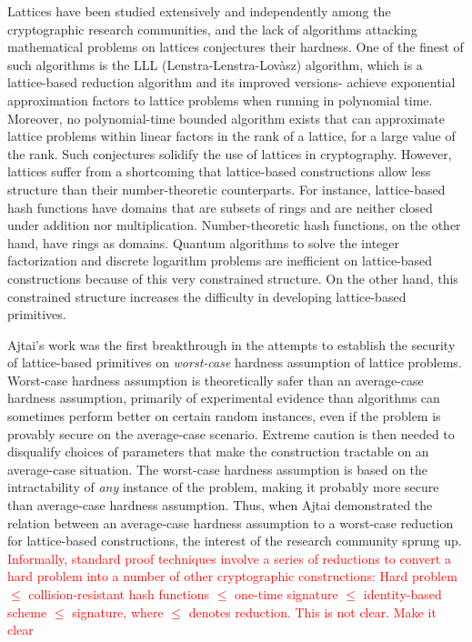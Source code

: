\documentclass[10pt]{elsarticle}
\begin{document}
Lattices have been studied extensively and independently among the
cryptographic research communities, and the lack of algorithms
attacking mathematical problems on lattices conjectures their
hardness. One of the finest of such algorithms is the LLL
(Lenstra-Lenstra-Lov{\`a}sz) \cite{LLL} algorithm, which is a
lattice-based reduction algorithm and its improved versions- achieve
exponential approximation factors to lattice problems when running
in polynomial time. Moreover, no polynomial-time bounded algorithm
exists that can approximate lattice problems within linear factors
in the rank of a lattice, for a large value of the rank. Such
conjectures solidify the use of lattices in cryptography. However,
lattices suffer from a shortcoming that lattice-based constructions
allow less structure than their number-theoretic counterparts. For
instance, lattice-based hash functions have domains that are subsets
of rings and are neither closed under addition nor multiplication.
Number-theoretic hash functions, on the other hand, have rings as
domains. Quantum algorithms to solve the integer factorization and
discrete logarithm problems \cite{CRHF_Shor1997} are inefficient on
lattice-based constructions because of this very constrained
structure. On the other hand, this constrained structure increases
the difficulty in developing lattice-based primitives.

Ajtai's work \cite{CRHF_Ajtai1996} was the first breakthrough in the
attempts to establish the security of lattice-based primitives on
\textit{worst-case} hardness assumption of lattice problems.
Worst-case hardness assumption is theoretically safer than an
average-case hardness assumption, primarily of experimental evidence
than algorithms can sometimes perform better on certain random
instances, even if the problem is provably secure on the
average-case scenario. Extreme caution is then needed to disqualify
choices of parameters that make the construction tractable on an
average-case situation. The worst-case hardness assumption is based
on the intractability of \textit{any} instance of the problem,
making it probably more secure than average-case hardness
assumption. Thus, when Ajtai demonstrated the relation between an
average-case hardness assumption to a worst-case reduction for
lattice-based constructions, the interest of the research community
sprung up. \textcolor{red}{Informally, standard proof techniques
involve a series of reductions to convert a hard problem into a
number of other cryptographic constructions: Hard problem $\leq$
collision-resistant hash functions $\leq$ one-time signature $\leq$
identity-based scheme $\leq$ signature, where $\leq$ denotes
reduction. This is not clear. Make it clear}
\end{document}
